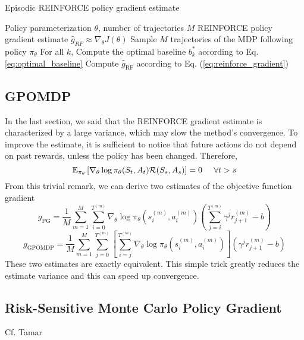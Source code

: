 \begin{algorithm}[t]
	\caption{Episodic REINFORCE policy gradient estimate}
	\label{algo:reinforce}
	\begin{algorithmic}[1]
		\Require Policy parameterization $\theta$, number of trajectories $M$
		\Ensure REINFORCE policy gradient estimate $\widehat{g}_{RF} \approx \nabla_\theta J(\theta)$
		\State Sample $M$ trajectories of the MDP following policy $\pi_\theta$
		\State For all $k$, Compute the optimal baseline $b_k^*$ according to Eq. \ref{eq:optimal_baseline}
		\State Compute $\widehat{g}_{\text{RF}}$ according to Eq. (\ref{eq:reinforce_gradient})
	\end{algorithmic}
\end{algorithm}



\subsection{GPOMDP}
In the last section, we said that the REINFORCE gradient estimate is
characterized by a large variance, which may slow the method's convergence. 
To improve the estimate, it is sufficient to notice that future actions do not
depend on past rewards, unless the policy has been changed. Therefore, 
\begin{equation}
	\E[\pi_\theta]{\nabla_\theta\log \pi_\theta(S_t, A_t) \calR(S_s, A_s)} = 0
	\;\;\;\;\; \forall t>s
\end{equation}
From this trivial remark, we can derive two estimates of the objective function
gradient
\begin{equation}
	g_{\text{PG}} = \frac{1}{M} \sum^{M}_{m=1} \sum_{i=0}^{T^{(m)}} 
	\nabla_\theta \log \pi_\theta(s_i^{(m)}, a_i^{(m)}) \left( 
	\sum^{T^{(m)}}_{j=i} \gamma^j r_{j+1}^{(m)} - b \right)
\end{equation}
\begin{equation}
	g_{\text{GPOMDP}} = \frac{1}{M} \sum^{M}_{m=1} \sum_{j=0}^{T^{(m)}} \left[ 
	\sum_{i=j}^{T^{(m)}} \nabla_\theta \log \pi_\theta(s_i^{(m)}, a_i^{(m)})
	\right] \left(\gamma^j r_{j+1}^{(m)} - b \right)  
\end{equation}
These two estimates are exactly equivalent. This simple trick greatly reduces the
estimate variance and this can speed up convergence. 

\subsection{Risk-Sensitive Monte Carlo Policy Gradient}
Cf. Tamar

